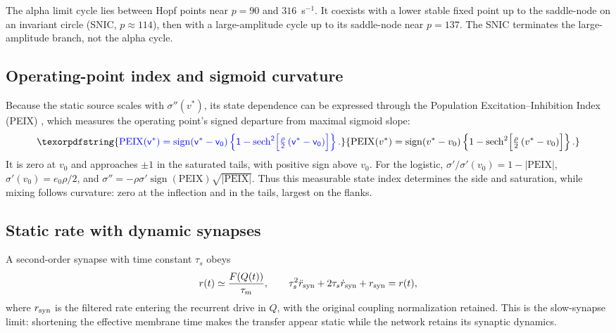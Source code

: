 \documentclass[11pt,a4paper]{article}
\newcommand{\Sig}{\sigma}
\providecommand{\DIFaddtex}[1]{{\protect\color{blue} \sf #1}} %
\providecommand{\DIFaddbegin}{} %
\providecommand{\DIFaddend}{} %
\providecommand{\DIFadd}[1]{\texorpdfstring{\DIFaddtex{#1}}{#1}} %
\begin{document}
The alpha limit cycle lies between Hopf points near $p=90$ and
$316$~s$^{-1}$. It coexists with a lower stable fixed point up to the
saddle-node on an invariant circle (SNIC, $p\approx114$), then with a
large-amplitude cycle up to its saddle-node near $p=137$. The SNIC
terminates the large-amplitude branch, not the alpha cycle.


\DIFaddbegin \subsection{\DIFadd{Operating-point index and sigmoid curvature}}\label{app:peix}
\DIFadd{Because the static source scales with $\Sig''(v^*)$, its state dependence
can be expressed through the Population Excitation--Inhibition Index (PEIX)
\cite{ruffini2025cfc}, which measures the operating point's signed departure from maximal sigmoid slope:
}\begin{equation}
\DIFadd{\mathrm{PEIX}(v^*)=\operatorname{sign}(v^*-v_0)
\left\{1-\operatorname{sech}^2\!\Big[\tfrac{\rho}{2}\,(v^*-v_0)\Big]\right\}.
\label{eq:peix}
}\end{equation}
\DIFadd{It is zero at $v_0$ and approaches $\pm1$ in the saturated tails, with
positive sign above $v_0$. For the logistic,
$\Sig'/\Sig'(v_0)=1-|\mathrm{PEIX}|$, $\Sig'(v_0)=e_0\rho/2$, and
$\Sig''=-\rho\Sig'\operatorname{sign}(\mathrm{PEIX})\sqrt{|\mathrm{PEIX}|}$.
Thus this measurable state index determines the side and saturation, while
mixing follows curvature: zero at the inflection and in the tails, largest
on the flanks.
}

\DIFaddend \subsection{Static rate with dynamic synapses}
A second-order synapse with time constant $\tau_s$ obeys
\begin{equation}
r(t)\simeq \frac{F(Q(t))}{\tau_m},\qquad
\tau_s^2\ddot r_{\rm syn}+2\tau_s\dot r_{\rm syn}+r_{\rm syn}=r(t),
\label{eq:slow_synapse}
\end{equation}
where $r_{\rm syn}$ is the filtered rate entering the recurrent drive in $Q$, with the original
coupling normalization retained. This is the slow-synapse limit: shortening the
effective membrane time makes the transfer appear static while the network retains
its synaptic dynamics.
\end{document}
